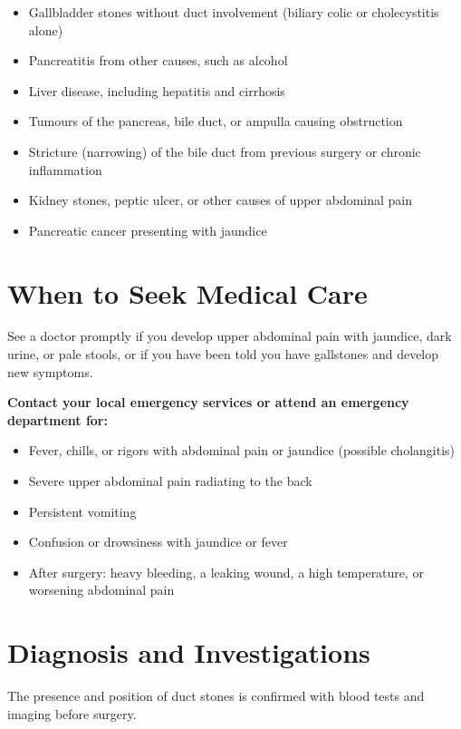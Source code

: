 \begin{itemize}
    \item Gallbladder stones without duct involvement (biliary colic or cholecystitis alone)
    \item Pancreatitis from other causes, such as alcohol
    \item Liver disease, including hepatitis and cirrhosis
    \item Tumours of the pancreas, bile duct, or ampulla causing obstruction
    \item Stricture (narrowing) of the bile duct from previous surgery or chronic inflammation
    \item Kidney stones, peptic ulcer, or other causes of upper abdominal pain
    \item Pancreatic cancer presenting with jaundice
\end{itemize}

\section*{When to Seek Medical Care}
See a doctor promptly if you develop upper abdominal pain with jaundice, dark urine, or pale stools, or if you have been told you have gallstones and develop new symptoms.

\textbf{Contact your local emergency services or attend an emergency department for:}
\begin{itemize}
    \item Fever, chills, or rigors with abdominal pain or jaundice (possible cholangitis)
    \item Severe upper abdominal pain radiating to the back
    \item Persistent vomiting
    \item Confusion or drowsiness with jaundice or fever
    \item After surgery: heavy bleeding, a leaking wound, a high temperature, or worsening abdominal pain
\end{itemize}

\section*{Diagnosis and Investigations}
The presence and position of duct stones is confirmed with blood tests and imaging before surgery.

